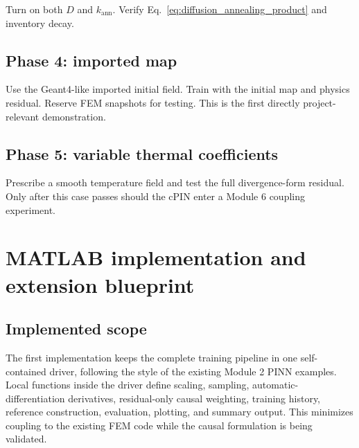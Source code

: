 \documentclass[11pt]{article}
\begin{document}
Turn on both $D$ and $k_{\mathrm{ann}}$. Verify Eq.~\eqref{eq:diffusion_annealing_product} and inventory decay.

\subsection{Phase 4: imported map}

Use the Geant4-like imported initial field. Train with the initial map and physics residual. Reserve FEM snapshots for testing. This is the first directly project-relevant demonstration.

\subsection{Phase 5: variable thermal coefficients}

Prescribe a smooth temperature field and test the full divergence-form residual. Only after this case passes should the cPIN enter a Module 6 coupling experiment.

\section{MATLAB implementation and extension blueprint}

\subsection{Implemented scope}

The first implementation keeps the complete training pipeline in one self-contained driver, following the style of the existing Module 2 PINN examples. Local functions inside the driver define scaling, sampling, automatic-differentiation derivatives, residual-only causal weighting, training history, reference construction, evaluation, plotting, and summary output. This minimizes coupling to the existing FEM code while the causal formulation is being validated.
\end{document}
